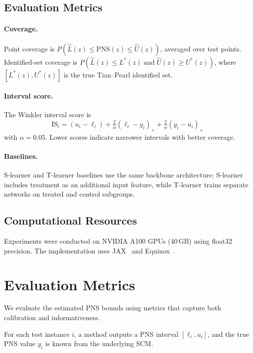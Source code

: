 \documentclass[accepted]{uai2026} %
\theoremstyle{plain}
\theoremstyle{definition}
\theoremstyle{remark}
\begin{document}
\subsection{Evaluation Metrics}
\label{app:metrics}

\paragraph{Coverage.}
Point coverage is
$P(\hat{L}(z) \le \mathrm{PNS}(z)
   \le \hat{U}(z))$,
averaged over test points.  Identified-set
coverage is
$P(\hat{L}(z) \le L^*(z) \;\text{and}\;
   \hat{U}(z) \ge U^*(z))$,
where $[L^*(z), U^*(z)]$ is the true
Tian--Pearl identified set.

\paragraph{Interval score.}
The Winkler interval score is
\[
  \mathrm{IS}_i
  = (u_i - \ell_i)
    + \tfrac{2}{\alpha}(\ell_i - y_i)_+
    + \tfrac{2}{\alpha}(y_i - u_i)_+
\]
with $\alpha = 0.05$.  Lower scores indicate
narrower intervals with better coverage.

\paragraph{Baselines.}
S-learner and T-learner baselines use the same
backbone architecture; S-learner includes
treatment as an additional input feature, while
T-learner trains separate networks on treated
and control subgroups.


\subsection{Computational Resources}
\label{app:compute-res}

Experiments were conducted on NVIDIA A100 GPUs
(40\,GB) using float32 precision.
The implementation uses
JAX~\citep{jax2018github} and
Equinox~\citep{kidger2021equinox}.



\section{Evaluation Metrics}\label{app:metrics-2}

We evaluate the estimated PNS bounds using metrics that capture both calibration
and informativeness.

For each test instance $i$, a method outputs a PNS interval
$[\ell_i, u_i]$, and the true PNS value $y_i$ is known from the underlying SCM.
\end{document}
